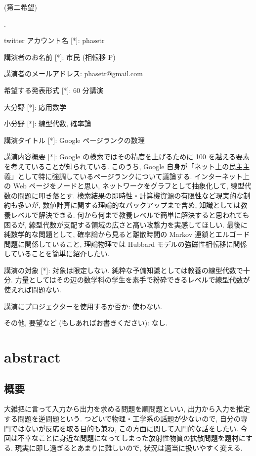 \documentclass[openany, a4paper, oneside]{jsbook}
\newcounter{enum2}
\renewenvironment{enumerate}{%
\begin{list}%
{%
\arabic{enum2}.\ \,%
}%
{%
\usecounter{enum2}
\setlength{\itemindent}{0pt}%
\setlength{\leftmargin}{15pt}%
\setlength{\rightmargin}{0pt}%
\setlength{\labelsep}{0pt}%
\setlength{\labelwidth}{6pt}%
\setlength{\itemsep}{0pt}%
\setlength{\parsep}{0pt}%
\setlength{\listparindent}{0pt}%
}
}{%
\end{list}%
}
\theoremstyle{break}
\theoremstyle{breakdefn}
\begin{document}
(第二希望)
\begin{enumerate}
\item twitter アカウント名 [*]: phasetr
\item 講演者のお名前 [*]: 市民 (相転移 P)
\item 講演者のメールアドレス: phasetr@gmail.com
\item 希望する発表形式 [*]: 60 分講演
\item 大分野 [*]: 応用数学
\item 小分野 [*]: 線型代数, 確率論
\item 講演タイトル [*]: Google ページランクの数理
\item 講演内容概要 [*]: Google の検索ではその精度を上げるために 100 を越える要素を考えていることが知られている.
   このうち, Google 自身が「ネット上の民主主義」として特に強調しているページランクについて議論する.
   インターネット上の Web ページをノードと思い,
   ネットワークをグラフとして抽象化して, 線型代数の問題に叩き落とす.
   検索結果の即時性・計算機資源の有限性など現実的な制約も多いが,
   数値計算に関する理論的なバックアップまで含め, 知識としては教養レベルで解決できる.
   何から何まで教養レベルで簡単に解決すると思われても困るが,
   線型代数が支配する領域の広さと高い攻撃力を実感してほしい.
   最後に純数学的な問題として, 確率論から見ると離散時間の Markov 連鎖とエルゴード問題に関係していること,
   理論物理では Hubbard モデルの強磁性相転移に関係していることを簡単に紹介したい.
\item 講演の対象 [*]: 対象は限定しない.
    純粋な予備知識としては教養の線型代数で十分.
    力量としてはその辺の数学科の学生を素手で粉砕できるレベルで線型代数が使えれば問題ない.
\item 講演にプロジェクターを使用するか否か: 使わない.
\item その他, 要望など (もしあればお書きください): なし.
\end{enumerate}
\section{abstract}

\subsection{概要}


大雑把に言って入力から出力を求める問題を順問題といい,
出力から入力を推定する問題を逆問題という.
つどいで物理・工学系の話題が少ないので, 自分の専門ではないが反応を取る目的も兼ね,
この方面に関して入門的な話をしたい.
今回は不幸なことに身近な問題になってしまった放射性物質の拡散問題を題材にする.
現実に即し過ぎるとあまりに難しいので, 状況は適当に扱いやすく変える.
\end{document}
